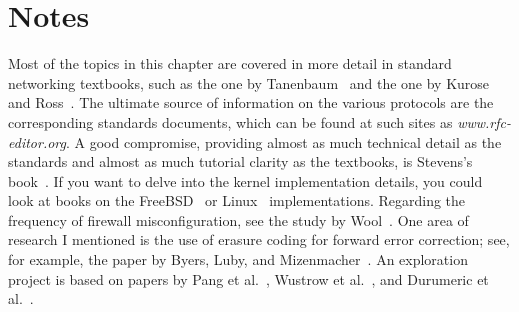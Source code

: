 \section*{Notes}
Most of the topics in this chapter are covered in more detail in
standard networking textbooks, such as the one by
Tanenbaum~\cite{max1150} and the one by Kurose and
Ross~\cite{max1151}.  The ultimate source of information on the
various protocols are the corresponding standards documents, which can
be found at such sites as \textit{www.rfc-editor.org}.  A good compromise,
providing almost as much technical detail as the standards and almost
as much tutorial clarity as the textbooks, is Stevens's
book~\cite{max1152}.  If you want to delve into the kernel
implementation details, you could look at books on the
FreeBSD~\cite{max1153} or Linux~\cite{max1154} implementations.
Regarding the frequency of firewall misconfiguration, see the study by Wool~\cite{max1146}.
One area of research I mentioned is the use of erasure coding for
forward error correction; see, for example, the paper by Byers, Luby,
and Mizenmacher~\cite{max1155}.  An exploration project is based on papers  by Pang et al.~\cite{max1156},
Wustrow et al.~\cite{Wustrow:2010:IBR:1879141.1879149}, and Durumeric et al.~\cite{184493}.
